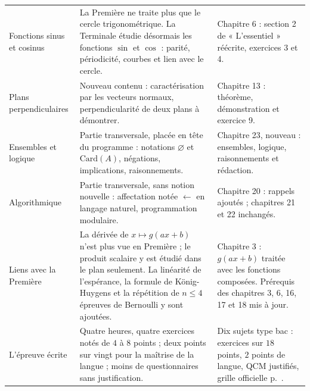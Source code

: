 \vspace{5mm}
{\fontsize{9}{11.8}\selectfont\renewcommand{\arraystretch}{1.32}%
\begin{tabularx}{\linewidth}{@{}>{\leavevmode\color{otNavy}\otSemi\fontsize{8.5}{10.5}\selectfont\raggedright\arraybackslash}p{30mm}
  @{\hspace{4mm}}Y@{\hspace{4mm}}>{\raggedright\arraybackslash}p{44mm}@{}}
\toprule
 &  &  \\
\midrule
Fonctions sinus et cosinus & La Première ne traite plus que le cercle trigonométrique. La Terminale étudie désormais les
  fonctions $\sin$ et $\cos$ : parité, périodicité, courbes et lien avec le cercle. & Chapitre 6 : section 2 de
  « L'essentiel » réécrite, exercices 3 et 4. \\
\midrule
Plans perpendiculaires & Nouveau contenu : caractérisation par les vecteurs normaux, perpendicularité de deux plans à
  démontrer. & Chapitre 13 : théorème, démonstration et exercice 9. \\
\midrule
Ensembles et logique & Partie transversale, placée en tête du programme : notations $\varnothing$ et $\mathrm{Card}(A)$,
  négations, implications, raisonnements. & Chapitre 23, nouveau : ensembles, logique, raisonnements et rédaction. \\
\midrule
Algorithmique & Partie transversale, sans notion nouvelle : affectation notée $\leftarrow$ en langage naturel, programmation
  modulaire. & Chapitre 20 : rappels ajoutés ; chapitres 21 et 22 inchangés. \\
\midrule
Liens avec la Première & La dérivée de $x\mapsto g(ax+b)$ n'est plus vue en Première ; le produit scalaire y est étudié dans
  le plan seulement. La linéarité de l'espérance, la formule de König-Huygens et la répétition de $n\leq4$ épreuves de Bernoulli
  y sont ajoutées. & Chapitre 3 : $g(ax+b)$ traitée avec les fonctions composées. Prérequis des chapitres 3, 6, 16, 17 et 18
  mis à jour. \\
\midrule
L'épreuve écrite & Quatre heures, quatre exercices notés de $4$ à $8$ points ; deux points sur vingt pour la maîtrise de la
  langue ; moins de questionnaires sans justification. & Dix sujets type bac : exercices sur $18$ points, $2$ points de langue,
  QCM justifiés, grille officielle p.~\pageref*{grille-langue}. \\
\bottomrule
\end{tabularx}}


